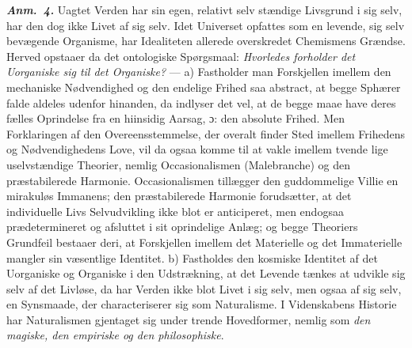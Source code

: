 \documentclass[12pt]{book}
\newcommand{\anm}[1]{\emph{\textbf{Anm.~#1.}}}
\newcommand{\dsi}{\textup{ɔ:}}
\newcommand{\opage}[1]{\marginnote{\footnotesize\textit{[#1]}}}
\begin{document}
\anm{4} Uagtet Verden har sin egen, relativt selv
\opage{219} stændige Livsgrund i sig selv, har den dog ikke Livet af sig selv. Idet Universet opfattes
som en levende, sig selv bevægende Organisme, har Idealiteten allerede overskredet
Chemismens Grændse. Herved opstaaer da det ontologiske Spørgsmaal: \emph{Hvorledes forholder
det Uorganiske sig til det Organiske?} --- a) Fastholder man Forskjellen imellem den
mechaniske Nødvendighed og den endelige Frihed saa abstract, at begge Sphærer falde aldeles
udenfor hinanden, da indlyser det vel, at de begge maae have deres fælles Oprindelse fra en
hiinsidig Aarsag, \dsi{} den absolute Frihed.
Men Forklaringen af den Overeensstemmelse, der overalt finder Sted imellem Frihedens og
Nødvendighedens Love, vil da ogsaa komme til at vakle imellem tvende lige uselvstændige
Theorier, nemlig Occasionalismen (Malebranche) og den præstabilerede Harmonie.
Occasionalismen tillægger den guddommelige Villie en mirakuløs Immanens; den præstabilerede
Harmonie forudsætter, at det individuelle Livs Selvudvikling ikke blot er anticiperet, men
endogsaa prædetermineret og afsluttet i sit oprindelige Anlæg; og begge Theoriers Grundfeil
bestaaer deri, at Forskjellen imellem det Materielle og det Immaterielle mangler sin
væsentlige Identitet. b) Fastholdes den kosmiske Identitet af det Uorganiske og Organiske i
den Udstrækning, at det Levende tænkes at udvikle sig selv af det Livløse, da har Verden
ikke blot Livet i sig selv, men ogsaa af sig selv, en Synsmaade, der characteriserer sig som
Naturalisme. I Videnskabens Historie har Naturalismen gjentaget sig under trende
Hovedformer, nemlig som \emph{den magiske, den empiriske og den philosophiske}.
\end{document}
